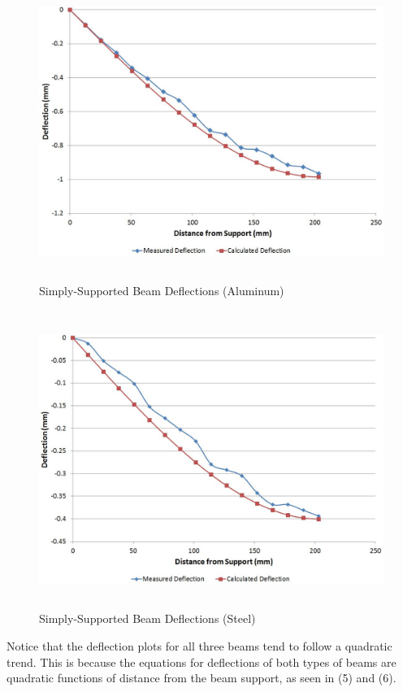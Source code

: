 \documentclass[12pt]{article}
\begin{document}
\begin{figure}[h!]  
  \centering
    \includegraphics[width=\linewidth,height=3.8in]{simp_support_a_deflection.JPG}
    \caption{Simply-Supported Beam Deflections (Aluminum)}
\end{figure}

\bigskip

\begin{figure}[h!]  
  \centering
    \includegraphics[width=\linewidth,height=3.8in]{simp_support_s_deflection.JPG}
    \caption{Simply-Supported Beam Deflections (Steel)}
\end{figure}


\newpage

Notice that the deflection plots for all three beams tend to follow a quadratic trend. This is because the equations for deflections of both types of beams are quadratic functions of distance from the beam support, as seen in (5) and (6).
\bigskip  
\end{document}
